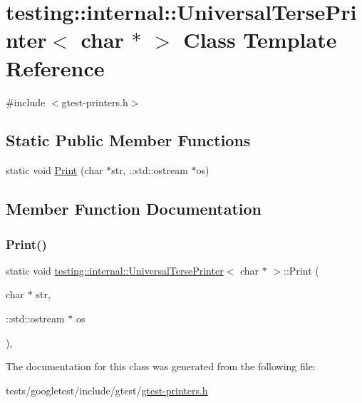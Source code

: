 \hypertarget{classtesting_1_1internal_1_1UniversalTersePrinter_3_01char_01_5_01_4}{}\section{testing\+:\+:internal\+:\+:Universal\+Terse\+Printer$<$ char $\ast$ $>$ Class Template Reference}
\label{classtesting_1_1internal_1_1UniversalTersePrinter_3_01char_01_5_01_4}


{\ttfamily \#include $<$gtest-\/printers.\+h$>$}

\subsection*{Static Public Member Functions}
\begin{DoxyCompactItemize}
\item 
static void \hyperlink{classtesting_1_1internal_1_1UniversalTersePrinter_3_01char_01_5_01_4_aa9ef95587c1461fe33e254af52401a43}{Print} (char $\ast$str, \+::std\+::ostream $\ast$os)
\end{DoxyCompactItemize}


\subsection{Member Function Documentation}
\mbox{\label{classtesting_1_1internal_1_1UniversalTersePrinter_3_01char_01_5_01_4_aa9ef95587c1461fe33e254af52401a43}} 
\subsubsection{\texorpdfstring{Print()}{Print()}}
{\footnotesize\ttfamily static void \hyperlink{classtesting_1_1internal_1_1UniversalTersePrinter}{testing\+::internal\+::\+Universal\+Terse\+Printer}$<$ char $\ast$ $>$\+::Print (\begin{DoxyParamCaption}\item[{char $\ast$}]{str,  }\item[{\+::std\+::ostream $\ast$}]{os }\end{DoxyParamCaption})\hspace{0.3cm}{\ttfamily [inline]}, {\ttfamily [static]}}



The documentation for this class was generated from the following file\+:\begin{DoxyCompactItemize}
\item 
tests/googletest/include/gtest/\hyperlink{gtest-printers_8h}{gtest-\/printers.\+h}\end{DoxyCompactItemize}
